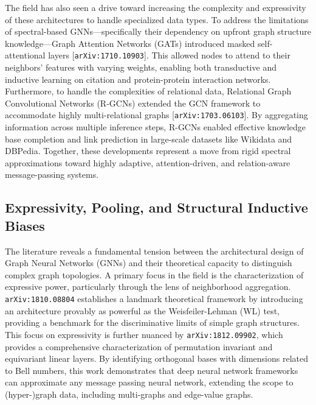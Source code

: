 \documentclass[11pt]{article}
\begin{document}
The field has also seen a drive toward increasing the complexity and expressivity of these architectures to handle specialized data types. To address the limitations of spectral-based GNNs—specifically their dependency on upfront graph structure knowledge—Graph Attention Networks (GATs) introduced masked self-attentional layers [\texttt{arXiv:1710.10903}]. This allowed nodes to attend to their neighbors' features with varying weights, enabling both transductive and inductive learning on citation and protein-protein interaction networks. Furthermore, to handle the complexities of relational data, Relational Graph Convolutional Networks (R-GCNs) extended the GCN framework to accommodate highly multi-relational graphs [\texttt{arXiv:1703.06103}]. By aggregating information across multiple inference steps, R-GCNs enabled effective knowledge base completion and link prediction in large-scale datasets like Wikidata and DBPedia. Together, these developments represent a move from rigid spectral approximations toward highly adaptive, attention-driven, and relation-aware message-passing systems.

\subsection{Expressivity, Pooling, and Structural Inductive Biases}

The literature reveals a fundamental tension between the architectural design of Graph Neural Networks (GNNs) and their theoretical capacity to distinguish complex graph topologies. A primary focus in the field is the characterization of expressive power, particularly through the lens of neighborhood aggregation. \texttt{arXiv:1810.08804} establishes a landmark theoretical framework by introducing an architecture provably as powerful as the Weisfeiler-Lehman (WL) test, providing a benchmark for the discriminative limits of simple graph structures. This focus on expressivity is further nuanced by \texttt{arXiv:1812.09902}, which provides a comprehensive characterization of permutation invariant and equivariant linear layers. By identifying orthogonal bases with dimensions related to Bell numbers, this work demonstrates that deep neural network frameworks can approximate any message passing neural network, extending the scope to (hyper-)graph data, including multi-graphs and edge-value graphs.
\end{document}
